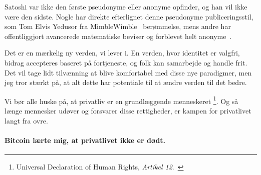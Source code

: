 Satoshi var ikke den første pseudonyme eller anonyme opfinder, og han vil 
ikke være den sidste. Nogle har direkte efterlignet denne pseudonyme 
publiceringsstil, som Tom Elvis Yedusor fra 
MimbleWimble~\cite{mimblewimble-origin} berømmelse, mens andre har
offentliggjort avancerede matematiske beviser og forblevet helt
anonyme~\cite{4chan-math}.

Det er en mærkelig ny verden, vi lever i. En verden, hvor identitet er
valgfri, bidrag accepteres baseret på fortjeneste, og folk kan
samarbejde og handle frit. Det vil tage lidt tilvænning at blive
komfortabel med disse nye paradigmer, men jeg tror stærkt på, at alt dette 
har potentiale til at ændre verden til det bedre.

Vi bør alle huske på, at privatliv er en grundlæggende menneskeret
\footnote{Universal Declaration of Human Rights, 
\textit{Artikel 12}.~\cite{article12}}. Og så længe
mennesker udøver og forsvarer disse rettigheder, er kampen for privatlivet 
langt fra ovre.

\paragraph{Bitcoin lærte mig, at privatlivet ikke er dødt.}

%
%
%
%
